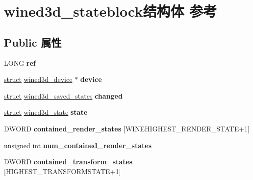 \hypertarget{structwined3d__stateblock}{}\section{wined3d\+\_\+stateblock结构体 参考}
\label{structwined3d__stateblock}
\subsection*{Public 属性}
\begin{DoxyCompactItemize}
\item 
\mbox{\label{structwined3d__stateblock_a0827490d9bcc302319d4f8b08c75b485}} 
L\+O\+NG {\bfseries ref}
\item 
\mbox{\label{structwined3d__stateblock_a13efbfa2c59deee6f90e3024092ce733}} 
\hyperlink{interfacestruct}{struct} \hyperlink{structwined3d__device}{wined3d\+\_\+device} $\ast$ {\bfseries device}
\item 
\mbox{\label{structwined3d__stateblock_aaa15b17feaa6019309bbc123c6adc319}} 
\hyperlink{interfacestruct}{struct} \hyperlink{structwined3d__saved__states}{wined3d\+\_\+saved\+\_\+states} {\bfseries changed}
\item 
\mbox{\label{structwined3d__stateblock_a9ab4952413010599695eaded391c6a47}} 
\hyperlink{interfacestruct}{struct} \hyperlink{structwined3d__state}{wined3d\+\_\+state} {\bfseries state}
\item 
\mbox{\label{structwined3d__stateblock_a2bd04aaece0972efe871f28b2d5e45b7}} 
D\+W\+O\+RD {\bfseries contained\+\_\+render\+\_\+states} \mbox{[}W\+I\+N\+E\+H\+I\+G\+H\+E\+S\+T\+\_\+\+R\+E\+N\+D\+E\+R\+\_\+\+S\+T\+A\+TE+1\mbox{]}
\item 
\mbox{\label{structwined3d__stateblock_af4ce553e68de34d538f7ae895bc7e5e2}} 
unsigned int {\bfseries num\+\_\+contained\+\_\+render\+\_\+states}
\item 
\mbox{\label{structwined3d__stateblock_a516a53665f0028b2b53d89153257a8bf}} 
D\+W\+O\+RD {\bfseries contained\+\_\+transform\+\_\+states} \mbox{[}H\+I\+G\+H\+E\+S\+T\+\_\+\+T\+R\+A\+N\+S\+F\+O\+R\+M\+S\+T\+A\+TE+1\mbox{]}

\end{DoxyCompactItemize}
